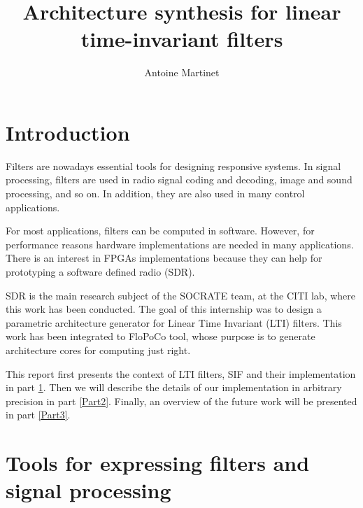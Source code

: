 \documentclass[twoside]{article}
\title{Architecture synthesis for linear time-invariant filters}
\author{Antoine Martinet}
\theoremstyle{remark}
\numberwithin{equation}{subsection}
\newcommand{\TODO}{\textbf{TODO}}
\begin{document}
\maketitle
\newpage
\tableofcontents
\newpage

\section*{ Introduction }

	Filters are nowadays essential tools for designing responsive systems.
	In signal processing, filters are used in
	radio signal coding and decoding, image and sound processing, and so on.
	In addition, they are also used in many control applications.



	For most applications, filters can be computed in software.
	However, for performance reasons hardware implementations are needed in many applications.
	There is an interest in FPGAs implementations because they can help for prototyping a software defined radio (SDR).

	
	SDR is the main research subject of the SOCRATE team, at the CITI lab, where this work has been conducted.
	The goal of this internship was to design a parametric architecture generator for Linear Time Invariant (LTI) filters.
	This work has been integrated to FloPoCo tool,
	whose purpose is to generate architecture cores for computing just right.


	This report first presents the context of LTI filters, SIF and their implementation in part \ref{Part1}.
	Then we will describe the details of our implementation in arbitrary precision in part \ref{Part2}.
	Finally, an overview of the future work will be presented in part \ref{Part3}.

\section{Tools for expressing filters and signal processing}
\label{Part1}

\end{document}

